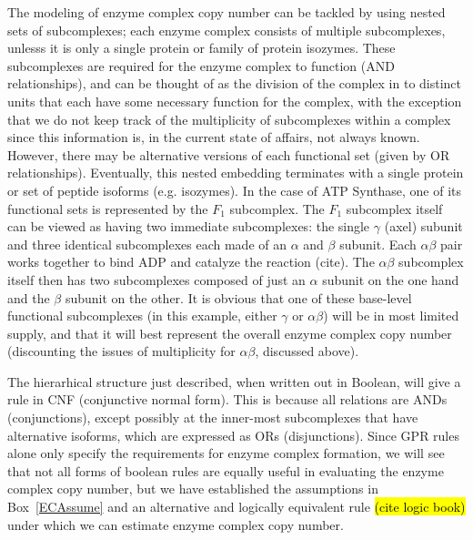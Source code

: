 \begin{methods}
The modeling of enzyme complex copy number can be tackled by using
nested sets of subcomplexes; each enzyme complex consists of multiple
subcomplexes, unlesss it is only a single protein or family of protein
isozymes.  These subcomplexes are required for the enzyme complex to
function (AND relationships), and can be thought of as the division of
the complex in to distinct units that each have some necessary
function for the complex, with the exception that we do not keep track
of the multiplicity of subcomplexes within a complex since this
information is, in the current state of affairs, not always known.
However, there may be alternative versions of each functional set
(given by OR relationships). Eventually, this nested embedding
terminates with a single protein or set of peptide isoforms
(e.g. isozymes).  In the case of ATP Synthase, one of its functional
sets is represented by the $F_1$ subcomplex. The $F_1$ subcomplex
itself can be viewed as having two immediate subcomplexes: the single
$\gamma$ (axel) subunit and three identical subcomplexes each made of
an $\alpha$ and $\beta$ subunit. Each $\alpha\beta$ pair works
together to bind ADP and catalyze the reaction (cite). The
$\alpha\beta$ subcomplex itself then has two subcomplexes composed of
just an $\alpha$ subunit on the one hand and the $\beta$ subunit on
the other.  It is obvious that one of these base-level functional
subcomplexes (in this example, either $\gamma$ or $\alpha\beta$) will
be in most limited supply, and that it will best represent the overall
enzyme complex copy number (discounting the issues of multiplicity for
$\alpha\beta$, discussed above).

%
%

The hierarhical structure just described, when written out in Boolean,
will give a rule in CNF (conjunctive normal form). This is because all
relations are ANDs (conjunctions), except possibly at the inner-most
subcomplexes that have alternative isoforms, which are expressed as
ORs (disjunctions). Since GPR rules alone only specify the
requirements for enzyme complex formation, we will see that not all
forms of boolean rules are equally useful in evaluating the enzyme
complex copy number, but we have established the assumptions in
Box~\ref{ECAssume} and an alternative and logically equivalent rule
\hl{(cite logic book)} under which we can estimate enzyme complex copy
number.


\end{methods}
